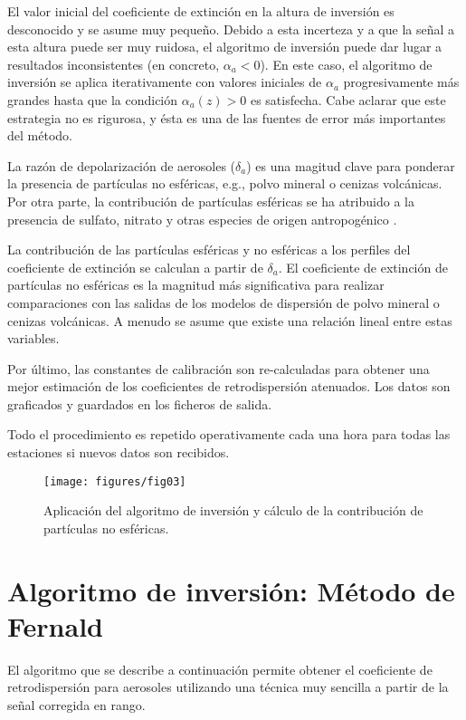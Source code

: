 \documentclass[12pt,a4paper,final]{report}
\begin{document}
	El valor inicial del coeficiente de extinción en la altura de inversión es desconocido y se asume muy pequeño. Debido a esta incerteza y a que la señal a esta altura puede ser muy ruidosa, el algoritmo de inversión puede dar lugar a resultados inconsistentes (en concreto, $\alpha_a<0$). En este caso, el algoritmo de inversión se aplica iterativamente con valores iniciales de $\alpha_a$ progresivamente más grandes hasta que la condición $\alpha_a(z)>0$ es satisfecha. Cabe aclarar que este estrategia no es rigurosa, y ésta es una de las fuentes de error más importantes del método.
	
	La razón de depolarización de aerosoles ($\delta_a$) es una magitud clave para ponderar la presencia de partículas no esféricas, e.g., polvo mineral o cenizas volcánicas. Por otra parte, la contribución de partículas esféricas se ha atribuido a la presencia de sulfato, nitrato y otras especies de origen antropogénico \citep{shimizu2017}. 
	
	La contribución de las partículas esféricas y no esféricas a los perfiles del coeficiente de extinción se calculan a partir de $\delta_a$. El coeficiente de extinción de partículas no esféricas es la magnitud más significativa para realizar comparaciones con las salidas de los modelos de dispersión de polvo mineral o cenizas volcánicas. A menudo se asume que existe una relación lineal entre estas variables.
	
	Por último, las constantes de calibración son re-calculadas  para obtener una mejor estimación de los coeficientes de retrodispersión atenuados. Los datos son graficados y guardados en los ficheros de salida.
	
	Todo el procedimiento es repetido operativamente cada una hora para todas las estaciones si nuevos datos son recibidos.
	
	\begin{figure}[t!]
	\centering
	\texttt{[image: figures/fig03]}
	\caption{
	Aplicación del algoritmo de inversión y cálculo de la contribución de partículas no esféricas.
	}
	\label{fig:scheme3}
	\end{figure}
	
	\chapter{Algoritmo de inversión: Método de Fernald}
	\label{ch:inversion}
	El algoritmo que se describe a continuación permite obtener el coeficiente de retrodispersión para aerosoles utilizando una técnica muy sencilla a partir de la señal corregida en rango.
	
\end{document}
